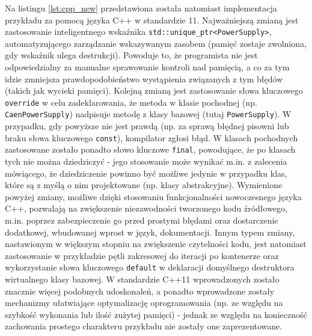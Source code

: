 


Na listingu \ref{lst:cpp_new} przedstawiona została natomiast implementacja przykładu za pomocą języka C++ w standardzie 11. Najważniejszą zmianą jest zastosowanie inteligentnego wskaźnika \lstinline{std::unique_ptr<PowerSupply>}, automatyzującego zarządzanie wskazywanym zasobem (pamięć zostaje zwolniona, gdy wskaźnik ulega destrukcji). Powoduje to, że programista nie jest odpowiedzialny za manualne sprawowanie kontroli nad pamięcią, a co za tym idzie zmniejsza prawdopodobieństwo wystąpienia związanych z tym błędów (takich jak wycieki pamięci). Kolejną zmianą jest zastosowanie słowa kluczowego \lstinline{override} w celu zadeklarowania, że metoda w klasie pochodnej (np. \lstinline{CaenPowerSupply}) nadpisuje metodę z klasy bazowej (tutaj \lstinline{PowerSupply}). W przypadku, gdy powyższe nie jest prawdą (np. za sprawą błędnej pisowni lub braku słowa kluczowego \lstinline{const}), kompilator zgłosi błąd. W klasach pochodnych zastosowane zostało ponadto słowo kluczowe \lstinline{final}, powodujące, że po klasach tych nie można dziedziczyć - jego stosowanie może wynikać m.in. z zalecenia mówiącego, że dziedziczenie powinno być możliwe jedynie w przypadku klas, które są z myślą o nim projektowane (np. klasy abstrakcyjne). Wymienione powyżej zmiany, możliwe dzięki stosowaniu funkcjonalności nowoczesnego języka C++, pozwalają na zwiększenie niezawodności tworzonego kodu źródłowego, m.in. poprzez zabezpieczenie go przed prostymi błędami oraz dostarczenie dodatkowej, wbudowanej wprost w język, dokumentacji. Innym typem zmiany, nastawionym w większym stopniu na zwiększenie czytelności kodu, jest natomiast zastosowanie w przykładzie pętli zakresowej do iteracji po kontenerze oraz wykorzystanie słowa kluczowego \lstinline{default} w deklaracji domyślnego destruktora wirtualnego klasy bazowej. W standardzie C++11 wprowadzonych zostało znacznie więcej podobnych udoskonaleń, a ponadto wprowadzone zostały mechanizmy ułatwiające optymalizację oprogramowania (np. ze względu na szybkość wykonania lub ilość zużytej pamięci) - jednak ze względu na konieczność zachowania prostego charakteru przykładu nie zostały one zaprezentowane.

